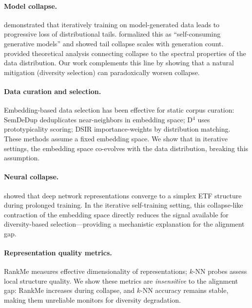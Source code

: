 \documentclass[11pt,a4paper]{article}
\begin{document}
\paragraph{Model collapse.}
\citet{shumailov2024nature} demonstrated that iteratively training on model-generated data leads to progressive loss of distributional tails.
\citet{alemohammad2024selfconsuming} formalized this as ``self-consuming generative models'' and showed tail collapse scales with generation count.
\citet{dohmatob2024tale} provided theoretical analysis connecting collapse to the spectral properties of the data distribution.
Our work complements this line by showing that a natural mitigation (diversity selection) can paradoxically worsen collapse.

\paragraph{Data curation and selection.}
Embedding-based data selection has been effective for static corpus curation: SemDeDup \cite{abbas2023semdedup} deduplicates near-neighbors in embedding space; D$^4$ \cite{tirumala2023d4} uses prototypicality scoring; DSIR \cite{xie2023dsir} importance-weights by distribution matching.
These methods assume a fixed embedding space. We show that in iterative settings, the embedding space co-evolves with the data distribution, breaking this assumption.

\paragraph{Neural collapse.}
\citet{papyan2020prevalence} showed that deep network representations converge to a simplex ETF structure during prolonged training.
In the iterative self-training setting, this collapse-like contraction of the embedding space directly reduces the signal available for diversity-based selection---providing a mechanistic explanation for the alignment gap.

\paragraph{Representation quality metrics.}
RankMe \cite{garrido2023rankme} measures effective dimensionality of representations; $k$-NN probes assess local structure quality.
We show these metrics are \emph{insensitive} to the alignment gap: RankMe increases during collapse, and $k$-NN accuracy remains stable, making them unreliable monitors for diversity degradation.
\end{document}
